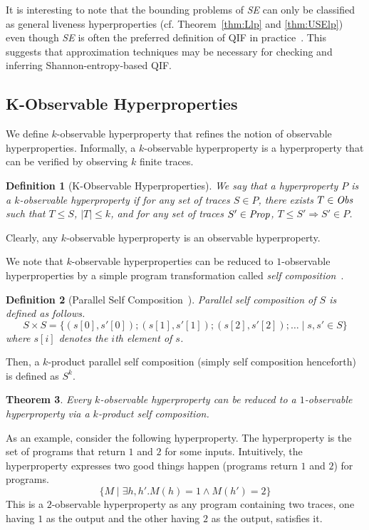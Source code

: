 \documentclass[]{eptcs}
\newcommand{\aset}[1]{\{{#1}\}}
\newtheorem{theorem}{Theorem}[section]
\newtheorem{definition}[theorem]{Definition}
\begin{document}
It is interesting to note that the bounding problems of {\it SE} can
only be classified as general liveness hyperproperties (cf.
Theorem~\ref{thm:Llp} and \ref{thm:USElp}) even though {\it SE} is
often the preferred definition of QIF in
practice~\cite{denning82,clarkjcs2007,malacaria:popl2007}.  This
suggests that approximation techniques may be necessary for checking
and inferring Shannon-entropy-based QIF.

\subsection{K-Observable Hyperproperties}

We define $k$-observable hyperproperty that refines the notion of
observable hyperproperties.  Informally, a $k$-observable
hyperproperty is a hyperproperty that can be verified by observing $k$
finite traces.
\begin{definition}[K-Observable Hyperproperties]
  We say that a hyperproperty $P$ is a $k$-observable hyperproperty if
  for any set of traces $S \in P$, there exists $T\in {\it Obs}$ such
  that $T\le S$, $|T|\le k$, and for any set of traces $S'\in{\it
    Prop}$, $T\le S'\Rightarrow S'\in P$.
\end{definition}
Clearly, any $k$-observable hyperproperty is an observable
hyperproperty.

We note that $k$-observable hyperproperties can be reduced to
$1$-observable hyperproperties by a simple program transformation
called {\em self composition}~\cite{barthe:csfw04,darvas:spc05}.
\begin{definition}[Parallel Self
  Composition~\cite{DBLP:journals/jcs/ClarksonS10}]
Parallel self composition of $S$ is defined as follows.
\[
S\times S = \aset{(s[0],s'[0]);(s[1],s'[1]);(s[2],s'[2]);\dots\mid s,s'\in S}
\]
where $s[i]$ denotes the $i$th element of $s$.
\end{definition}
Then, a $k$-product parallel self composition (simply self composition
henceforth) is defined as $S^k$.
\begin{theorem}
Every $k$-observable hyperproperty can be reduced to a $1$-observable
hyperproperty via a $k$-product self composition.
\end{theorem}
As an example, consider the following hyperproperty.  The
hyperproperty is the set of programs that return $1$ and $2$ for some
inputs.  Intuitively, the hyperproperty expresses two good things
happen (programs return $1$ and $2$) for programs.
\[
\aset{M\mid \exists h,h'. M(h)=1 \wedge M(h')=2}
\]
This is a $2$-observable hyperproperty as any program containing two
traces, one having $1$ as the output and the other having $2$ as the
output, satisfies it.
\end{document}
